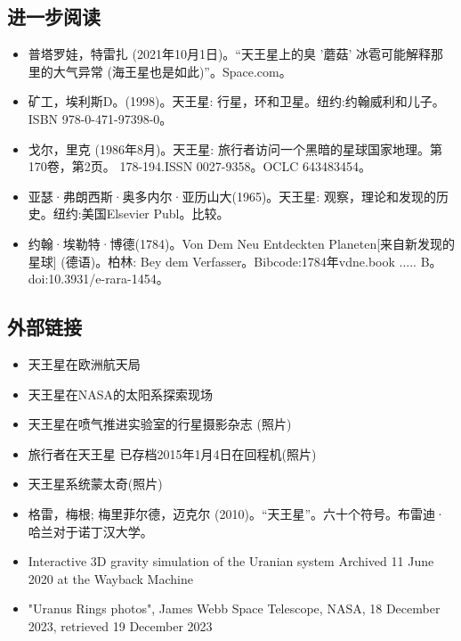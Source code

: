 \subsection{进一步阅读}
\begin{itemize}
\item 普塔罗娃，特雷扎 (2021年10月1日)。“天王星上的臭 '蘑菇' 冰雹可能解释那里的大气异常 (海王星也是如此)”。Space.com。
\item 矿工，埃利斯D。(1998)。天王星: 行星，环和卫星。纽约:约翰威利和儿子。ISBN 978-0-471-97398-0。
\item 戈尔，里克 (1986年8月)。天王星: 旅行者访问一个黑暗的星球国家地理。第170卷，第2页。 178-194.ISSN 0027-9358。OCLC 643483454。
\item 亚瑟·弗朗西斯·奥多内尔·亚历山大(1965)。天王星: 观察，理论和发现的历史。纽约:美国Elsevier Publ。比较。
\item 约翰·埃勒特·博德(1784)。Von Dem Neu Entdeckten Planeten[来自新发现的星球] (德语)。柏林: Bey dem Verfasser。Bibcode:1784年vdne.book ..... B。doi:10.3931/e-rara-1454。
\end{itemize}
\subsection{外部链接}
\begin{itemize}
\item 天王星在欧洲航天局
\item 天王星在NASA的太阳系探索现场
\item 天王星在喷气推进实验室的行星摄影杂志 (照片)
\item 旅行者在天王星 已存档2015年1月4日在回程机(照片)
\item 天王星系统蒙太奇(照片)
\item 格雷，梅根; 梅里菲尔德，迈克尔 (2010)。“天王星”。六十个符号。布雷迪·哈兰对于诺丁汉大学。
\item Interactive 3D gravity simulation of the Uranian system Archived 11 June 2020 at the Wayback Machine
\item "Uranus Rings photos", James Webb Space Telescope, NASA, 18 December 2023, retrieved 19 December 2023
\end{itemize}







